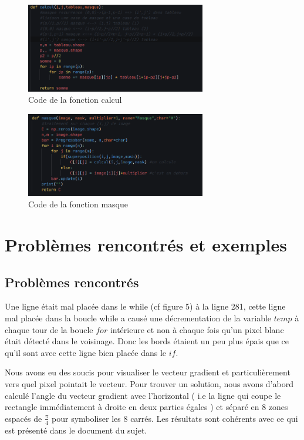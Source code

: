 \documentclass[hidelinks,11pt]{article}
\theoremstyle{mytheoremstyle}
\theoremstyle{mytheoremstyle}
\theoremstyle{myproblemstyle}
\begin{document}
        \begin{figure}[h]
            \centering
            \includegraphics[width=0.7\textwidth]{figs/fig3}
            \caption{Code de la fonction calcul \cite{git-calcul}}
        \end{figure}
        \begin{figure}[h]
            \centering
            \includegraphics[width=0.7\textwidth]{figs/fig4}
            \caption{Code de la fonction masque \cite{git-masque}}
        \end{figure}
    
    \newpage
    \section{Problèmes rencontrés et exemples}
    \subsection{Problèmes rencontrés}

    Une ligne était mal placée dans le while (cf figure 5) à la ligne 281, 
    cette ligne mal placée dans la boucle while a causé une décrementation de la variable $temp$ à chaque tour de la boucle $for$ intérieure
     et non à chaque fois qu’un pixel blanc était détecté dans le voisinage. 
     Donc les bords étaient un peu plus épais que ce qu’il sont avec cette ligne bien placée dans le $if$.
        \newline


     Nous avons eu des soucis pour visualiser le vecteur gradient et particulièrement vers quel pixel pointait le vecteur. 
     Pour trouver un solution, nous avons d’abord calculé l’angle du vecteur gradient avec l’horizontal 
     ( i.e la ligne qui coupe le rectangle immédiatement à droite en deux parties égales ) 
     et séparé en 8 zones espacés de $\frac{\pi}{4}$ pour symboliser les 8 carrés.
     Les résultats sont cohérents avec ce qui est présenté dans le document du sujet.
\end{document}
